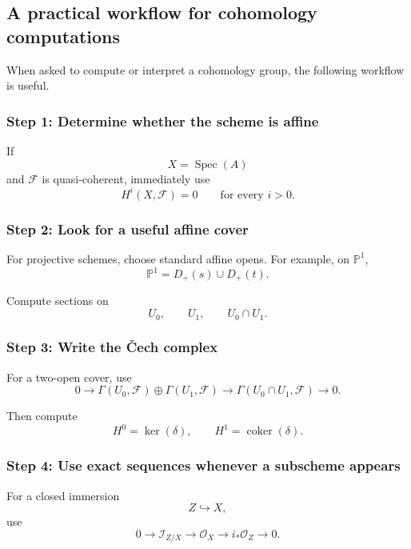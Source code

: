 \documentclass[12pt,a4paper]{article}
\theoremstyle{notespace}
\begin{document}
\subsection{A practical workflow for cohomology computations}

When asked to compute or interpret a cohomology group, the following workflow
is useful.

\subsubsection{Step 1: Determine whether the scheme is affine}

If
\[
X=\operatorname{Spec}(A)
\]
and \(\mathcal{F}\) is quasi-coherent, immediately use
\[
H^{i}(X,\mathcal{F})=0
\qquad
\text{for every }i>0.
\]

\subsubsection{Step 2: Look for a useful affine cover}

For projective schemes, choose standard affine opens. For example, on
\(\mathbb{P}^{1}\),
\[
\mathbb{P}^{1}
=
D_{+}(s)\cup D_{+}(t).
\]

Compute sections on
\[
U_{0},
\qquad
U_{1},
\qquad
U_{0}\cap U_{1}.
\]

\subsubsection{Step 3: Write the Čech complex}

For a two-open cover, use
\[
0
\longrightarrow
\Gamma(U_{0},\mathcal{F})
\oplus
\Gamma(U_{1},\mathcal{F})
\longrightarrow
\Gamma(U_{0}\cap U_{1},\mathcal{F})
\longrightarrow
0.
\]

Then compute
\[
H^{0}=\ker(\delta),
\qquad
H^{1}=\operatorname{coker}(\delta).
\]

\subsubsection{Step 4: Use exact sequences whenever a subscheme appears}

For a closed immersion
\[
Z\hookrightarrow X,
\]
use
\[
0
\longrightarrow
\mathcal{I}_{Z/X}
\longrightarrow
\mathcal{O}_{X}
\longrightarrow
i_{*}\mathcal{O}_{Z}
\longrightarrow
0.
\]
\end{document}
